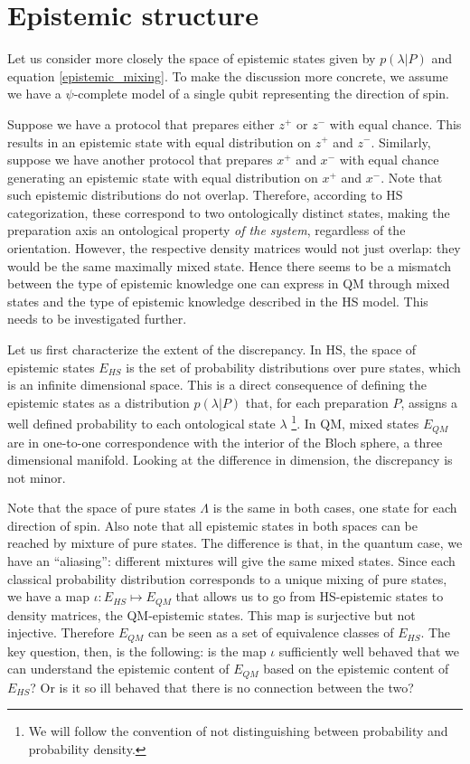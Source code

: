 \documentclass[twocolumn,prl,floatfix,superscriptaddress]{revtex4-2}
\begin{document}
\section{Epistemic structure}

Let us consider more closely the space of epistemic states given by $p(\lambda | P)$ and equation \ref{epistemic_mixing}. To make the discussion more concrete, we assume we have a $\psi$-complete model of a single qubit representing the direction of spin.

Suppose we have a protocol that prepares either $z^+$ or $z^-$ with equal chance. This results in an epistemic state with equal distribution on $z^+$ and $z^-$. Similarly, suppose we have another protocol that prepares $x^+$ and $x^-$ with equal chance generating an epistemic state with equal distribution on $x^+$ and $x^-$. Note that such epistemic distributions do not overlap. Therefore, according to HS categorization, these correspond to two ontologically distinct states, making the preparation axis an ontological property \emph{of the system}, regardless of the orientation. However, the respective density matrices would not just overlap: they would be the same maximally mixed state. Hence there seems to be a mismatch between the type of epistemic knowledge one can express in QM through mixed states and the type of epistemic knowledge described in the HS model. This needs to be investigated further.

Let us first characterize the extent of the discrepancy. In HS, the space of epistemic states $E_{HS}$ is the set of probability distributions over pure states, which is an infinite dimensional space. This is a direct consequence of defining the epistemic states as a distribution $p(\lambda|P)$ that, for each preparation $P$, assigns a well defined probability to each ontological state $\lambda$ \footnote{We will follow the convention of not distinguishing between probability and probability density.}. In QM, mixed states $E_{QM}$ are in one-to-one correspondence with the interior of the Bloch sphere, a three dimensional manifold. Looking at the difference in dimension, the discrepancy is not minor.

Note that the space of pure states $\Lambda$ is the same in both cases, one state for each direction of spin. Also note that all epistemic states in both spaces can be reached by mixture of pure states. The difference is that, in the quantum case, we have an ``aliasing'': different mixtures will give the same mixed states. Since each classical probability distribution corresponds to a unique mixing of pure states, we have a map $\iota : E_{HS} \mapsto E_{QM}$ that allows us to go from HS-epistemic states to density matrices, the QM-epistemic states. This map is surjective but not injective. Therefore $E_{QM}$ can be seen as a set of equivalence classes of $E_{HS}$. The key question, then, is the following: is the map $\iota$ sufficiently well behaved that we can understand the epistemic content of $E_{QM}$ based on the epistemic content of $E_{HS}$? Or is it so ill behaved that there is no connection between the two?
\end{document}
